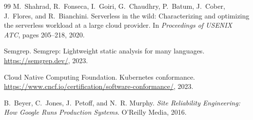 \documentclass[10pt,twocolumn]{article}
\begin{document}
\begin{thebibliography}{99}
M.~Shahrad, R.~Fonseca, I.~Goiri, G.~Chaudhry, P.~Batum, J.~Cober,
  J.~Flores, and R.~Bianchini.
\newblock Serverless in the wild: Characterizing and optimizing the serverless
  workload at a large cloud provider.
\newblock In \emph{Proceedings of USENIX ATC}, pages 205--218, 2020.

Semgrep.
\newblock Semgrep: Lightweight static analysis for many languages.
\newblock \url{https://semgrep.dev/}, 2023.

Cloud Native Computing Foundation.
 {Kubernetes} conformance.
\newblock \url{https://www.cncf.io/certification/software-conformance/}, 2023.

B.~Beyer, C.~Jones, J.~Petoff, and N.~R. Murphy.
\newblock \emph{Site Reliability Engineering: How {Google} Runs Production
  Systems}.
\newblock O'Reilly Media, 2016.

\end{thebibliography}
\end{document}
